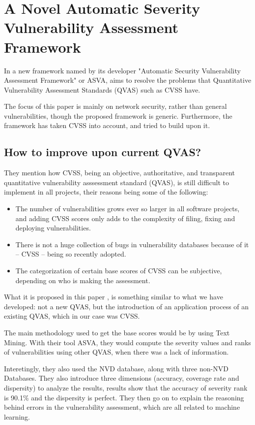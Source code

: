 \section{A Novel Automatic Severity Vulnerability Assessment Framework}

In \parencite{novelty} a new framework named by its developer "Automatic Security Vulnerability Assessment Framework" or ASVA, aims to resolve the problems that Quantitative Vulnerability Assessment Standards (QVAS) such as CVSS have.

The focus of this paper is mainly on network security, rather than general vulnerabilities, though the proposed framework is generic. Furthermore, the framework has taken CVSS into account, and tried to build upon it.

\subsection{How to improve upon current QVAS?}

They mention how CVSS, being an objective, authoritative, and transparent quantitative vulnerability asssessment standard (QVAS), is still difficult to implement in all projects, their reasons being some of the following:

\begin{itemize}
	\item The number of vulnerabilities grows ever so larger in all software projects, and adding CVSS scores only adds to the complexity of filing, fixing and deploying vulnerabilities.
	\item There is not a huge collection of bugs in vulnerability databases because of it -- CVSS -- being so recently adopted.
	\item The categorization of certain base scores of CVSS can be subjective, depending on who is making the assessment.
\end{itemize}

What it is proposed in this paper \parencite{novelty}, is something similar to what we have developed: not a new QVAS, but the introduction of an application process of an existing QVAS, which in our case was CVSS.

The main methodology used to get the base scores would be by using Text Mining. With their tool ASVA, they would compute the severity values and ranks of vulnerabilities using other QVAS, when there was a lack of information.

Interetingly, they also used the NVD database, along with three non-NVD Databases. They also introduce three dimensions (accuracy, coverage rate and dispersity) to analyze the results, results show that the accuracy of severity rank is 90.1\% and the dispersity
is perfect. They then go on to explain the reasoning behind errors in the vulnerability assessment, which are all related to machine learning.

